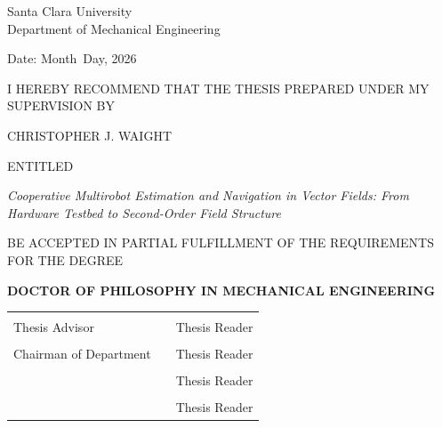 \documentclass[12pt, letterpaper, oneside]{report}
\newcommand{\thesistitle}{Cooperative Multirobot Estimation and Navigation in Vector Fields: From Hardware Testbed to Second-Order Field Structure}
\newcommand{\thesisauthor}{Christopher J. Waight}
\newcommand{\thesisdepartment}{Mechanical Engineering}
\newcommand{\thesisdegreefield}{Mechanical Engineering}
\newcommand{\thesisyear}{2026}
\newcommand{\thesismonth}{Month}
\newcommand{\thesisday}{Day}
\begin{document}

\thispagestyle{empty}
\begin{center}
  \large
  Santa Clara University \\[6pt]
  Department of \thesisdepartment

  \vspace{0.3in}

  \normalsize
  Date: \thesismonth\ \thesisday, \thesisyear

  \vspace{0.3in}

  I HEREBY RECOMMEND THAT THE THESIS PREPARED UNDER MY SUPERVISION BY

  \vspace{0.2in}
  \MakeUppercase{\thesisauthor}
  \vspace{0.2in}

  ENTITLED

  \vspace{0.15in}
  \textit{\thesistitle}
  \vspace{0.15in}

  BE ACCEPTED IN PARTIAL FULFILLMENT OF THE REQUIREMENTS FOR THE DEGREE

  \vspace{0.15in}
  \textbf{DOCTOR OF PHILOSOPHY IN \MakeUppercase{\thesisdegreefield}}
\end{center}

\vspace{0.25in}

\noindent
\begin{tabular}{p{2.6in} p{0.2in} p{2.6in}}
  \hrulefill & & \hrulefill \\[2pt]
  Thesis Advisor & & Thesis Reader \\[20pt]
  \hrulefill & & \hrulefill \\[2pt]
  Chairman of Department & & Thesis Reader \\[20pt]
  & & \hrulefill \\[2pt]
  & & Thesis Reader \\[20pt]
  & & \hrulefill \\[2pt]
  & & Thesis Reader
\end{tabular}
\end{document}
